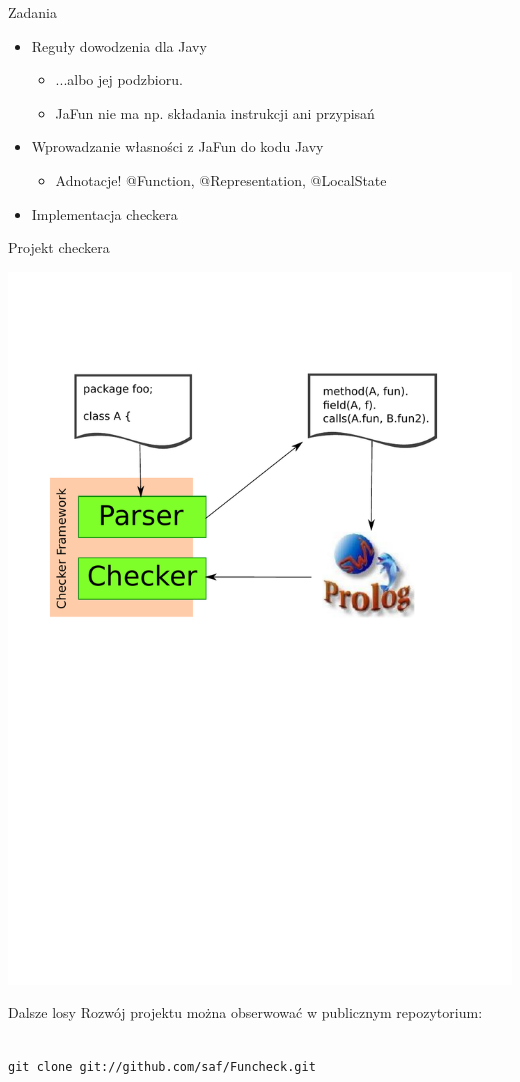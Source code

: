 \documentclass{beamer}
\begin{document}
\begin{frame}{Zadania}
  \begin{itemize}
  \item<1-> Reguły dowodzenia dla Javy
    \pause
    \begin{itemize}
      \item ...albo jej podzbioru.
      \item JaFun nie ma np. składania instrukcji ani przypisań
    \end{itemize}
  \item<2-> Wprowadzanie własności z JaFun do kodu Javy
    \begin{itemize}
    \item Adnotacje! {\color{annot} @Function}, 
      {\color{annot} @Representation}, {\color{annot} @LocalState}
    \end{itemize}
  \item<3-> Implementacja checkera
  \end{itemize}
\end{frame}

\begin{frame}{Projekt checkera}
  \begin{center}
    \includegraphics{img/project.pdf}
  \end{center}
\end{frame}

\begin{frame}{Dalsze losy}
Rozwój projektu można obserwować w publicznym repozytorium:
\begin{center}
\vspace{3mm}
\\
\vspace{3mm}
\texttt{git clone git://github.com/saf/Funcheck.git}
\end{center}
\end{frame}
\end{document}
